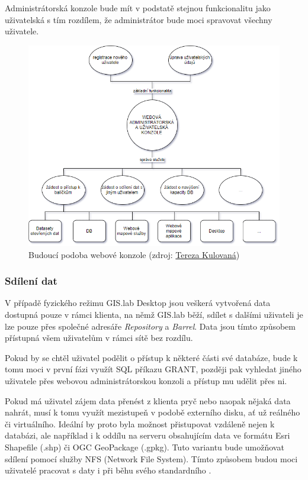 Administrátorská konzole bude mít v podstatě stejnou funkcionalitu
jako uživatelská s tím rozdílem, že administrátor bude moci spravovat
všechny uživatele.

\begin{figure}[H] \centering
    \includegraphics[width=400pt]{./pictures/console_services_02.png}
    \caption[Budoucí podoba webové konzole]{Budoucí podoba webové konzole (zdroj:
	\href{}{Tereza Kulovaná})}
    \label{fig:konzole-sluzby}
\end{figure}

\subsubsection{Sdílení dat}
V případě fyzického režimu GIS.lab Desktop jsou veškerá vytvořená data
dostupná pouze v rámci klienta, na němž GIS.lab běží, sdílet s dalšími
uživateli je lze pouze přes společné adresáře \textit{Repository} a
\textit{Barrel}. Data jsou tímto způsobem přístupná všem uživatelům v
rámci sítě bez rozdílu.

Pokud by se chtěl uživatel podělit o přístup k některé části své
databáze, bude k tomu moci v první fázi využít SQL příkazu GRANT,
později pak vyhledat jiného uživatele přes webovou administrátorskou
konzoli a přístup mu udělit přes ni.

Pokud má uživatel zájem data přenést z klienta pryč nebo naopak nějaká
data nahrát, musí k tomu využít mezistupeň v podobě externího disku,
ať už reálného či virtuálního. Ideální by proto byla možnost
přistupovat vzdáleně nejen k databázi, ale například i k oddílu na
serveru obsahujícím data ve formátu Esri Shapefile (.shp) či OGC
GeoPackage (.gpkg). Tuto variantu bude umožňovat sdílení pomocí služby
NFS (Network File System). Tímto způsobem budou moci uživatelé
pracovat s daty i při běhu svého standardního .

